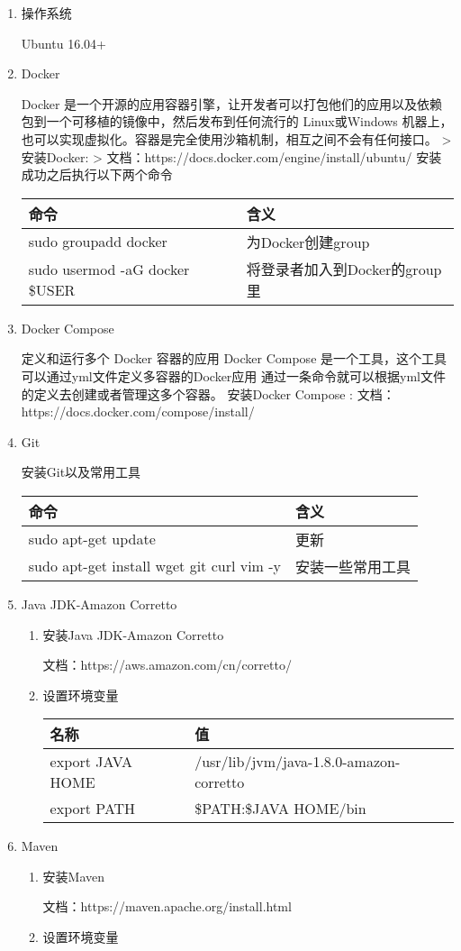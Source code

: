 \documentclass{article}
\begin{document}
\begin{enumerate}
\item
  操作系统

  Ubuntu 16.04+
\item
  Docker

  Docker
  是一个开源的应用容器引擎，让开发者可以打包他们的应用以及依赖包到一个可移植的镜像中，然后发布到任何流行的
  Linux或Windows
  机器上，也可以实现虚拟化。容器是完全使用沙箱机制，相互之间不会有任何接口。
  \textgreater{} 安装Docker: \textgreater{}
  文档：https://docs.docker.com/engine/install/ubuntu/
  安装成功之后执行以下两个命令

  \begin{longtable}[]{@{}ll@{}}
  \toprule
  \endhead
  命令 & 含义\tabularnewline
  \hline
  sudo groupadd docker & 为Docker创建group\tabularnewline
  sudo usermod -aG docker \$USER &
  将登录者加入到Docker的group里\tabularnewline
  \bottomrule
  \end{longtable}
\item
  Docker Compose

  定义和运行多个 Docker 容器的应用 Docker Compose
  是一个工具，这个工具可以通过yml文件定义多容器的Docker应用
  通过一条命令就可以根据yml文件的定义去创建或者管理这多个容器。
  安装Docker Compose : 文档：https://docs.docker.com/compose/install/
\item
  Git

  安装Git以及常用工具

  \begin{longtable}[]{@{}ll@{}}
  \toprule
  \endhead
  命令 & 含义\tabularnewline
  \hline
  sudo apt-get update & 更新\tabularnewline
  sudo apt-get install wget git curl vim -y &
  安装一些常用工具\tabularnewline
  \bottomrule
  \end{longtable}
\item
  Java JDK-Amazon Corretto

  \begin{enumerate}
  \item
    安装Java JDK-Amazon Corretto

    文档：https://aws.amazon.com/cn/corretto/
  \item
    设置环境变量

    \begin{longtable}[]{@{}ll@{}}
    \toprule
    \endhead
    名称 & 值\tabularnewline
    \hline
    export JAVA HOME &
    /usr/lib/jvm/java-1.8.0-amazon-corretto\tabularnewline
    export PATH & \$PATH:\$JAVA HOME/bin\tabularnewline
    \bottomrule
    \end{longtable}
  \end{enumerate}
\item
  Maven

  \begin{enumerate}
  \item
    安装Maven

    文档：https://maven.apache.org/install.html
  \item
    设置环境变量
  \end{enumerate}
\end{enumerate}
\end{document}
